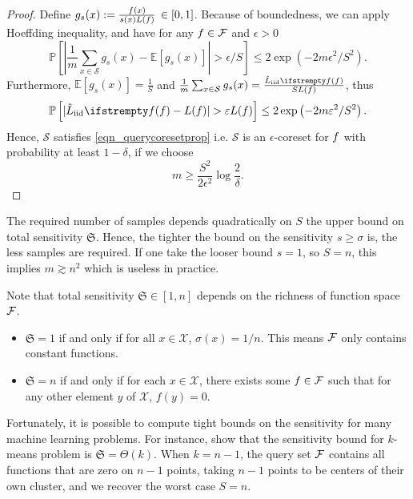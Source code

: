 \begin{proof}
    Define $g_s(x) :=  \frac{f(x)}{s(x) L(f)}  \, \in[0,1]$.
    Because of boundedness, we can apply Hoeffding inequality, and have for any $f \in \mathcal{F}$ and $\epsilon >0$
    \begin{equation*}
        \mathbb{P}\left[\left|\frac{1}{m} \sum_{x \in \mathcal{S}} g_s(x) - \mathbb{E}\left[g_s(x)\right]\right|>\epsilon/S\right] \leq 2 \exp \left(-2 m \epsilon^2/S^2\right).
    \end{equation*}
    Furthermore, $\mathbb{E}\left[g_s(x)\right]=\frac{1}{S}$ and $\frac{1}{m} \sum_{x \in \mathcal{S}} g_s(x)=\frac{\estloss{\textrm{iid}}{\query}}{S L(\query)}$, thus
    \begin{equation*}
        \mathbb{P}\left[|\estloss{\textrm{iid}}{\query} - L(\query)|>\epsilon L(\query)\right] \leq 2 \exp \left(-2 m \epsilon^2/S^2\right).
    \end{equation*}
    Hence, $\mathcal{S}$ satisfies \cref{eqn_querycoresetprop} i.e. $\mathcal{S}$ is an $\epsilon$-coreset for $f$  with probability at least $1-\delta$, if we choose
    \begin{equation*}
        m \geq \frac{S^{2}}{2 \epsilon^{2}} \log \frac{2}{\delta}.
    \end{equation*}
\end{proof}



\newpage


The required number of samples depends quadratically on $S$ the upper bound on total sensitivity $\mathfrak{S}$. Hence, the tighter the bound on the sensitivity $s \geq \sigma$ is, the less samples are required. If one take the looser bound $s=1$, so $S=n$, this implies $m \gtrsim n^2$ which is useless in practice.

Note that total sensitivity $\mathfrak{S} \in [1,n]$ depends on the richness of function space $\mathcal{F}$. 
\begin{itemize}
    \item $\mathfrak{S}=1$ if and only if for all $x\in\mathcal{X}$, $\sigma(x)=1/n$. This means $\mathcal{F}$ only contains constant functions.
    \item $\mathfrak{S}=n$ if and only if for each $x\in \mathcal{X}$, there exists some $f \in \mathcal{F}$ such that for any other element $y$ of $\mathcal{X}$, $f(y)=0$.
\end{itemize}

Fortunately, it is possible to compute tight bounds on the sensitivity for many machine learning problems. For instance, \cite{lucic2016_lineartime_detection_via_sensitivity} show that the sensitivity bound for $k$-means problem is $\mathfrak{S} = \Theta(k)$. When $k = n-1$, the query set $\mathcal{F}$ contains all functions that are zero on $n-1$ points, taking $n-1$ points to be centers of their own cluster, and we recover the worst case $S = n$.

